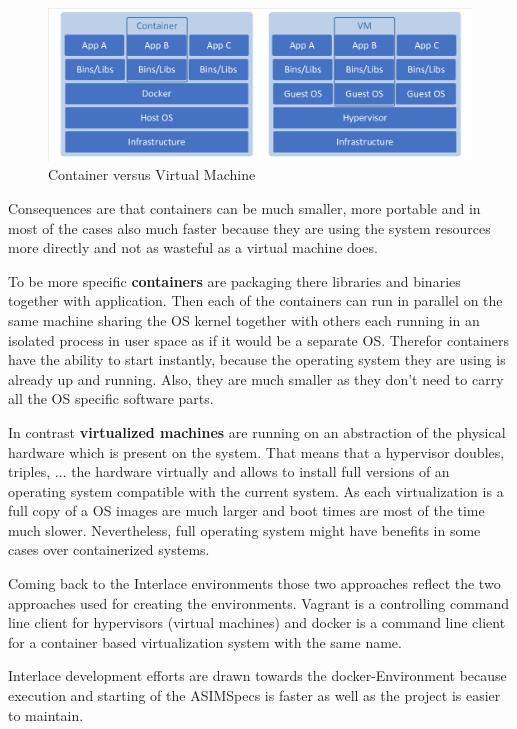 \begin{figure}[htbp]
  \centering
  \includegraphics[width=1.0\textwidth, clip, trim=1mm 1mm 1mm 1mm]{Figures/container_vs_vm}
  \caption{Container versus Virtual Machine}
  \label{fig:docker-env-container-vs-vm}
\end{figure}

Consequences are that containers can be much smaller, more portable and in most of the cases also much faster because they are using the system resources more directly and not as wasteful as a virtual machine does.

To be more specific \textbf{containers} are packaging there libraries and binaries together with application. Then each of the containers can run in parallel on the same machine sharing the OS kernel together with others each running in an isolated process in user space as if it would be a separate OS. Therefor containers have the ability to start instantly, because the operating system they are using is already up and running. Also, they are much smaller as they don't need to carry all the OS specific software parts.

In contrast \textbf{virtualized machines} are running on an abstraction of the physical hardware which is present on the system. That means that a hypervisor doubles, triples, ... the hardware virtually and allows to install full versions of an operating system compatible with the current system. As each virtualization is a full copy of a OS images are much larger and boot times are most of the time much slower. Nevertheless, full operating system might have benefits in some cases over containerized systems.

Coming back to the Interlace environments those two approaches reflect the two approaches used for creating the environments. Vagrant is a controlling command line client for hypervisors (virtual machines) and docker is a command line client for a container based virtualization system with the same name.

Interlace development efforts are drawn towards the docker-Environment because execution and starting of the ASIMSpecs is faster as well as the project is easier to maintain.
